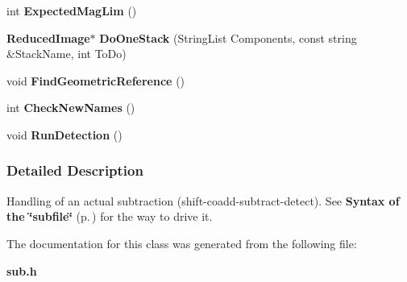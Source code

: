 \begin{CompactItemize}
\item 
{}
int {\bf Expected\-Mag\-Lim} ()\label{class_sub_a6}

\item 
{}
{\bf Reduced\-Image}$\ast$ {\bf Do\-One\-Stack} (String\-List Components, const string \&Stack\-Name, int To\-Do)\label{class_sub_a7}

\item 
{}
void {\bf Find\-Geometric\-Reference} ()\label{class_sub_a8}

\item 
{}
int {\bf Check\-New\-Names} ()\label{class_sub_a9}

\item 
{}
void {\bf Run\-Detection} ()\label{class_sub_a10}

\end{CompactItemize}


\subsubsection{Detailed Description}
Handling of an actual subtraction (shift-coadd-subtract-detect). See {\bf Syntax of the \char`\"{}subfile\char`\"{}} {\rm (p.\,\pageref{subfile})} for the way to drive it.



The documentation for this class was generated from the following file:\begin{CompactItemize}
\item 
{\bf sub.h}\end{CompactItemize}

